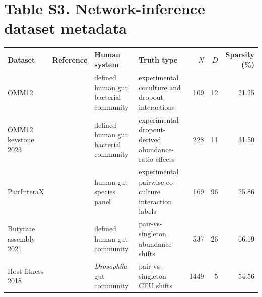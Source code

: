 \documentclass[11pt]{article}
\begin{document}
\section*{Table S3. Network-inference dataset metadata}
\scriptsize
\setlength{\tabcolsep}{2.5pt}
\begin{center}
\begin{tabular}{>{\raggedright\arraybackslash}p{}>{\raggedright\arraybackslash}p{}>{\raggedright\arraybackslash}p{}>{\raggedright\arraybackslash}p{}rrr}
\toprule
Dataset & Reference & Human system & Truth type & $N$ & $D$ & Sparsity (\%) \\
\midrule
OMM12 & \citealt{Weiss2022OMM12} & defined human gut bacterial community & experimental coculture and dropout interactions & 109 & 12 & 21.25 \\
OMM12 keystone 2023 & \citealt{Weiss2023Keystone} & defined human gut bacterial community & experimental dropout-derived abundance-ratio effects & 228 & 11 & 31.50 \\
PairInteraX & \citealt{Zhu2025PairInteraX} & human gut species panel & experimental pairwise co-culture interaction labels & 169 & 96 & 25.86 \\
Butyrate assembly 2021 & \citealt{Clark2021Butyrate} & defined human gut community & pair-vs-singleton abundance shifts & 537 & 26 & 66.19 \\
Host fitness 2018 & \citealt{Gould2018HostFitness} & \textit{Drosophila} gut community & pair-vs-singleton CFU shifts & 1449 & 5 & 54.56 \\
\bottomrule
\end{tabular}
\end{center}
\setlength{\tabcolsep}{6pt}
\normalsize

\end{document}
